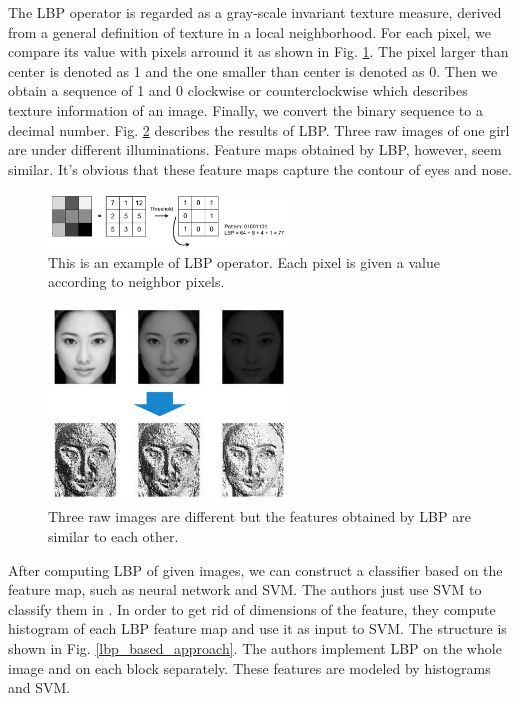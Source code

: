 \documentclass[journal]{IEEEtran}
\begin{document}
The LBP operator \cite{ojala2002multiresolution} is regarded as a gray-scale invariant texture measure, derived from a general definition of texture in a local neighborhood. For each pixel, we compare its value with pixels arround it as shown in Fig. \ref{LBP}. The pixel larger than center is denoted as 1 and the one smaller than center is denoted as 0. Then we obtain a sequence of 1 and 0 clockwise or counterclockwise which describes texture information of an image. Finally, we convert the binary sequence to a decimal number. Fig. \ref{results_of_LBP} describes the results of LBP. Three raw images of one girl are under different illuminations. Feature maps obtained by LBP, however, seem similar. It's obvious that these feature maps capture the contour of eyes and nose.

\begin{figure}[!t]
\centering
\includegraphics[width=2.5in]{img/2-A-(3).png}
\caption{This is an example of LBP operator. Each pixel is given a value according to neighbor pixels. \cite{maatta2011face}}
\label{LBP}
\end{figure}

\begin{figure}[!t]
\centering
\includegraphics[width=2.5in]{img/2-A-(4).png}
\caption{Three raw images are different but the features obtained by LBP are similar to each other.}
\label{results_of_LBP}
\end{figure}

After computing LBP of given images, we can construct a classifier based on the feature map, such as neural network and SVM. The authors just use SVM to classify them in \cite{chingovska2012effectiveness}\cite{maatta2011face}. In order to get rid of dimensions of the feature, they compute histogram of each LBP feature map and use it as input to SVM. The structure is shown in Fig. \ref{lbp_based_approach}. The authors implement LBP on the whole image and on each block separately. These features are modeled by histograms and SVM.
\end{document}
